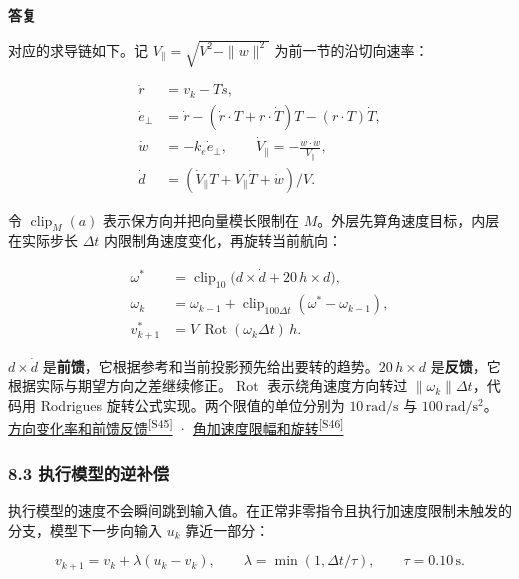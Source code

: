 \documentclass[11pt,a4paper]{article}
\numberwithin{equation}{topic}
\newenvironment{reply}{%
  \par\noindent\textcolor{replycolor}{\sffamily\bfseries 答复}\par\nobreak\ignorespaces
}{\par\medskip}
\newcommand{\sourceref}[2]{\hyperlink{source-#1}{#2\textsuperscript{[#1]}}}
\begin{document}
\begin{reply}
对应的求导链如下。记 \(V_\parallel=\sqrt{V^2-\|w\|^2}\) 为前一节的沿切向速率：

\begin{equation}
\label{eq:derivatives}
\begin{aligned}
\dot r&=v_k-T\dot s,\\
\dot e_\perp&=\dot r-
    (\dot r\cdot T+r\cdot\dot T)T-(r\cdot T)\dot T,\\
\dot w&=-k_e\dot e_\perp,\qquad
\dot V_\parallel=-\frac{w\cdot\dot w}{V_\parallel},\\
\dot d&=(\dot V_\parallel T+V_\parallel\dot T+\dot w)/V.
\end{aligned}
\end{equation}

令 \(\operatorname{clip}_M(a)\) 表示保方向并把向量模长限制在 \(M\)。外层先算角速度目标，内层在实际步长 \(\Delta t\) 内限制角速度变化，再旋转当前航向：

\begin{equation}
\label{eq:rotation}
\begin{aligned}
\omega^*&=\operatorname{clip}_{10}\bigl(d\times\dot d
                   +20\,h\times d\bigr),\\
\omega_k&=\omega_{k-1}
       +\operatorname{clip}_{100\Delta t}(\omega^*-\omega_{k-1}),\\
v^*_{k+1}&=V\,\operatorname{Rot}(\omega_k\Delta t)\,h.
\end{aligned}
\end{equation}

\(d\times\dot d\) 是\textbf{前馈}，它根据参考和当前投影预先给出要转的趋势。\(20\,h\times d\) 是\textbf{反馈}，它根据实际与期望方向之差继续修正。\(\operatorname{Rot}\) 表示绕角速度方向转过 \(\|\omega_k\|\Delta t\)，代码用 Rodrigues 旋转公式实现。两个限值的单位分别为 \(10\,\mathrm{rad/s}\) 与 \(100\,\mathrm{rad/s^2}\)。 \sourceref{S45}{方向变化率和前馈反馈} · \sourceref{S46}{角加速度限幅和旋转}

\subsubsection*{8.3 执行模型的逆补偿}

执行模型的速度不会瞬间跳到输入值。在正常非零指令且执行加速度限制未触发的分支，模型下一步向输入 \(u_k\) 靠近一部分：

\begin{equation}
\label{eq:actuator}
v_{k+1}=v_k+\lambda(u_k-v_k),\qquad
\lambda=\min(1,\Delta t/\tau),\qquad \tau=0.10\,\mathrm s.
\end{equation}


\end{reply}
\end{document}

